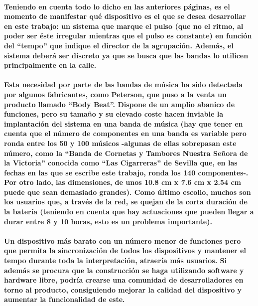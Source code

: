 \paragraph{
Teniendo en cuenta todo lo dicho en las anteriores páginas, es el momento de manifestar qué dispositivo es el que se desea desarrollar en este trabajo: un sistema que marque el pulso (que no el ritmo, al poder ser éste irregular mientras que el pulso es constante) en función del “tempo” que indique el director de la agrupación. Además, el sistema deberá ser discreto ya que se busca que las bandas lo utilicen principalmente en la calle.
}

\paragraph{
Esta necesidad por parte de las bandas de música ha sido detectada por algunos fabricantes, como Peterson, que puso a la venta un producto llamado “Body Beat”. Dispone de un amplio abanico de funciones, pero su tamaño y su elevado coste hacen inviable la implantación del sistema en una banda de música (hay que tener en cuenta que el número de componentes en una banda es variable pero ronda entre los 50 y 100 músicos -algunas de ellas sobrepasan este número, como la “Banda de Cornetas y Tambores Nuestra Señora de la Victoria” conocida como “Las Cigarreras” de Sevilla \cite{cigarreras} que, en las fechas en las que se escribe este trabajo, ronda los 140 componentes-. Por otro lado, las dimensiones, de unos 10.8 cm x 7.6 cm x 2.54 cm puede que sean demasiado grandes). Como último escollo, muchos son los usuarios que, a través de la red, se quejan de la corta duración de la batería (teniendo en cuenta que hay actuaciones que pueden llegar a durar entre 8 y 10 horas, esto es un problema importante).
}

\paragraph{
Un dispositivo más barato con un número menor de funciones pero que permita la sincronización de todos los dispositivos y mantener el tempo durante toda la interpretación, atraería más usuarios. Si además se procura que la construcción se haga utilizando software y hardware libre, podría crearse una comunidad de desarrolladores en torno al producto, consiguiendo mejorar la calidad del dispositivo y aumentar la funcionalidad de este.
}
